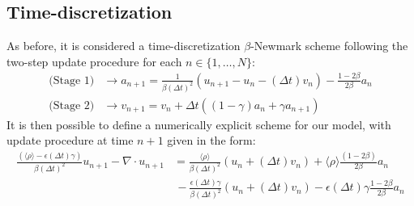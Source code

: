 \subsection{Time-discretization}
As before, it is considered a time-discretization $\beta$-Newmark scheme following the two-step update procedure for each $n \in \{1,\dots, N\}$:
\begin{align*}
    \text{(Stage 1)} &\longrightarrow a_{n+1} = \frac{1}{\beta (\Delta t)^2} (u_{n+1}-u_{n}-(\Delta t)v_n) - \frac{1-2\beta}{2\beta}a_n\\
    \text{(Stage 2)}& \longrightarrow v_{n+1} = v_n + \Delta t((1-\gamma)a_n + \gamma a_{n+1})
\end{align*}
It is then possible to define a numerically explicit scheme for our model, with update procedure at time $n+1$ given in the form:
\begin{align*}
    \frac{(\langle \rho \rangle- \epsilon (\Delta t) \gamma)}{\beta (\Delta t)^2} u_{n+1} - \nabla \cdot u_{n+1} &= \frac{\langle \rho \rangle}{\beta (\Delta t)^2} (u_n + (\Delta t)v_n) + \langle \rho \rangle\frac{ (1-2\beta)}{2\beta}a_n \\
    & \, - \frac{\epsilon (\Delta t)\gamma}{\beta (\Delta t)^2}(u_n + (\Delta t)v_n) - \epsilon (\Delta t)\gamma\frac{1-2\beta}{2 \beta} a_n
\end{align*}

